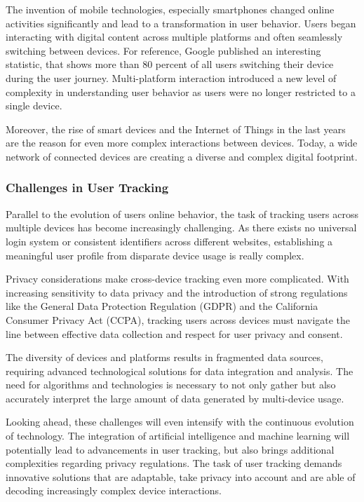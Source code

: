 The invention of mobile technologies, especially smartphones changed online activities significantly and lead to a transformation in user behavior. Users began interacting with digital content across multiple platforms and often seamlessly switching between devices. For reference, Google published an interesting statistic, that shows more than 80 percent of all users switching their device during the user journey. Multi-platform interaction introduced a new level of complexity in understanding user behavior as users were no longer restricted to a single device.

Moreover, the rise of smart devices and the Internet of Things in the last years are the reason for  even more complex interactions between devices. Today, a wide network of connected devices are creating a diverse and complex digital footprint.

\subsubsection{Challenges in User Tracking}
Parallel to the evolution of users online behavior, the task of tracking users across multiple devices has become increasingly challenging. As there exists no universal login system or consistent identifiers across different websites, establishing a meaningful user profile from disparate device usage is really complex.

Privacy considerations make cross-device tracking even more complicated. With increasing sensitivity to data privacy and the introduction of strong regulations like the General Data Protection Regulation (GDPR) and the California Consumer Privacy Act (CCPA), tracking users across devices must navigate the line between effective data collection and respect for user privacy and consent.

The diversity of devices and platforms results in fragmented data sources, requiring advanced technological solutions for data integration and analysis. The need for algorithms and technologies is necessary to not only gather but also accurately interpret the large amount of data generated by multi-device usage.

Looking ahead, these challenges will even intensify with the continuous evolution of technology. The integration of artificial intelligence and machine learning will potentially lead to advancements in user tracking, but also brings additional complexities regarding privacy regulations. The task of user tracking demands innovative solutions that are adaptable, take privacy into account and are able of decoding increasingly complex device interactions.

